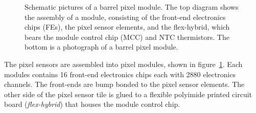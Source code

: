  \begin{figure}[htbp]
 	\centering
 	\caption{Schematic pictures of a barrel pixel module. The top diagram shows the assembly of a module, consisting of the front-end electronics chips (FEs), the pixel sensor elements, and the flex-hybrid, which bears the module control chip (MCC) and NTC thermistors. The bottom is a photograph of a barrel pixel module.}
 	\label{fig:ATLAS-pixel-module}
 \end{figure}
 
 

The pixel sensors are assembled into pixel modules, shown in figure~\ref{fig:ATLAS-pixel-module}. Each modules contains 16 front-end electronics chips each with 2880 electronics channels. The front-ends are bump bonded to the pixel sensor elements. The other side of the pixel sensor tile is glued to a flexible polyimide printed circuit board (\emph{flex-hybrid}) that houses the module control chip.

